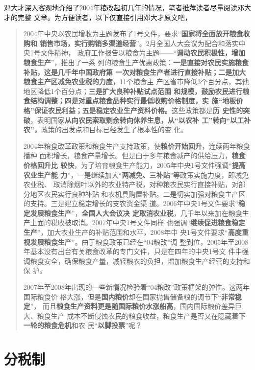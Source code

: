 邓大才深入客观地介绍了2004年粮改起初几年的情况，笔者推荐读者尽量阅读邓大才的完整
文章。为方便读者，以下仅直接引用邓大才原文吧，
\begin{quotation}
  2004年中央以农民增收为主题发布了1号文件，要求“\textbf{国家将全面放开粮食收购和
    销售市场，实行购销多渠道经营}”。2月全国人大会议为配合和落实中央1号文件精神，
  政府工作报告以粮食为主题——“\textbf{调动农民积极性，增加粮食生产}”，推出了一系
  列的粮食生产优惠政策：\textbf{一是直接对农民实施粮食补贴，这是几千年中国政府第
    一次对粮食生产者进行直接补贴；二是加大粮食主产区减免农业税的力度，}11个粮食主
  产区省市降低3个百分点，其他地区降低1个百分点；\textbf{三是扩大良种补贴试点范围
    和规模，鼓励农民进行粮食结构调整；四是对重点粮食品种实行最低收购价格制度，实
    施“地板价格”保证农民利益；五是稳定农业生产资料价格。}这些政策都是\textbf{历
    史性的突破}，表明国家\textbf{从向农民索取剩余转向休养生息，从“以农补
    工”转向“以工补农”，}政策的出发点和目标已经发生了根本性的变
  化。

  2004年粮食改革政策和粮食生产支持政策，使\textbf{粮价开始回升}，连续两年粮食播种
  面积增长，粮食产量增长。但是由于多年粮食减产的供给压力，\textbf{粮食价格回升比
    较快}，为了培育粮食生产能力，2005年中央1号文件强调“\textbf{提高农业生产能
    力}”，一是继续加大“\textbf{两减免、三补贴}”等政策实施力度，即减免农业税、
  取消除烟叶以外的农业特产税，对种粮农民实行直接补贴，对部分地区农民实行良种补贴
  和农机具购置补贴。二是切实加强对粮食主产区的支持。三是建立稳定增长的支农资金渠
  道。2006年中央1号文件要求“\textbf{稳定发展粮食生产}”，\textbf{全国人大会议决
    定取消农业税}，几千年以来加在粮食生产上面的税收被取消。2007年中央1号文件同样
  也强调“\textbf{继续促进粮食稳定生产}”，加大农业生产的补贴范围和水平，2008年中
  央1号文件要求“\textbf{高度重视发展粮食生产}”。由于粮食政策已经在“04粮改”调
  整到位，2005年至2008年基本没有出台有关粮食改革的专门文件，只是在四年的中央1号文
  件中强调粮食安全，确保粮食产量，减轻粮农的负担，增加粮食生产经营的支持和保
  护。\cite{dacailianggai}

  2007年至2008年出现的一些新情况检验着“04粮改”政策框架的弹性。这两年国际粮食价
  格大涨，但是\textbf{国内粮价}却在国家抛售储备粮的调节下“\textbf{非常稳定}”，
  而且\textbf{粮食生产资料更是随国际粮价水涨船高}，国内国际粮价差异巨大、粮食生产
  成本不断侵蚀农民的粮食收益，粮食生产是否又在隐藏着\textbf{下一轮的粮食危机}和农
  民“\textbf{以脚投票}”呢？
\end{quotation}



\section{分税制}

